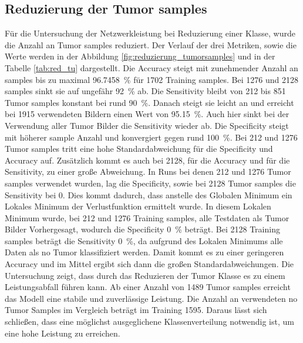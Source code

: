 \subsection{Reduzierung der Tumor samples}
Für die Untersuchung der Netzwerkleistung bei Reduzierung einer Klasse, wurde die Anzahl an Tumor samples reduziert.
Der Verlauf der drei Metriken, sowie die Werte werden in der Abbildung \ref{fig:reduzierung_tumorsamples} und in der Tabelle \ref{tab:red_tu} dargestellt.
Die Accuracy steigt mit zunehmender Anzahl an samples bis zu maximal \SI{96.7458}{\percent} für 1702 Training samples.
Bei 1276 und 2128 samples sinkt sie auf ungefähr \SI{92}{\percent} ab. 
Die Sensitivity bleibt von 212 bis 851 Tumor samples konstant bei rund \SI{90}{\%}.
Danach steigt sie leicht an und erreicht bei 1915 verwendeten Bildern einen Wert von \SI{95.15}{\%}.
Auch hier sinkt bei der Verwendung aller Tumor Bilder die Sensitivity wieder ab.
Die Specificity steigt mit höherer sample Anzahl und konvergiert gegen rund \SI{100}{\%}.
Bei 212 und 1276 Tumor samples tritt eine hohe Standardabweichung für die Specificity und Accuracy auf.
Zusätzlich kommt es auch bei 2128, für die Accuracy und für die Sensitivity, zu einer große Abweichung. 
In Runs bei denen 212 und 1276 Tumor samples verwendet wurden, lag die Specificity, 
sowie bei 2128 Tumor samples die Sensitivity bei 0.
Dies kommt dadurch, dass anstelle des Globalen Minimum ein Lokales Minimum der Verlustfunktion ermittelt wurde.
In diesem Lokalen Minimum wurde, bei 212 und 1276 Training samples, alle Testdaten als Tumor Bilder Vorhergesagt, wodurch die Specificity \SI{0}{\%} beträgt.
Bei 2128 Training samples beträgt die Sensitivity \SI{0}{\%}, da aufgrund des Lokalen Minimums alle Daten als no Tumor klassifiziert werden.
Damit kommt es zu einer geringeren Accuracy und im Mittel ergibt sich dann die großen Standardabweichungen.
Die Untersuchung zeigt, dass durch das Reduzieren der Tumor Klasse es zu einem Leistungsabfall führen kann.
Ab einer Anzahl von 1489 Tumor samples erreicht das Modell eine stabile und zuverlässige Leistung.
Die Anzahl an verwendeten no Tumor Samples im Vergleich beträgt im Training 1595. 
Daraus lässt sich schließen, dass eine möglichst ausgeglichene Klassenverteilung notwendig ist, um eine hohe Leistung zu erreichen.
